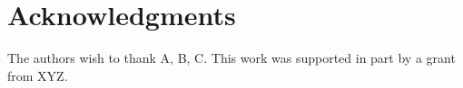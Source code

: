 \documentclass{egpubl}
\begin{document}
	
	
	\section*{Acknowledgments}
		The authors wish to thank A, B, C. This work was supported in part by
		a grant from XYZ.
	
	
%	
	
	
\end{document}
